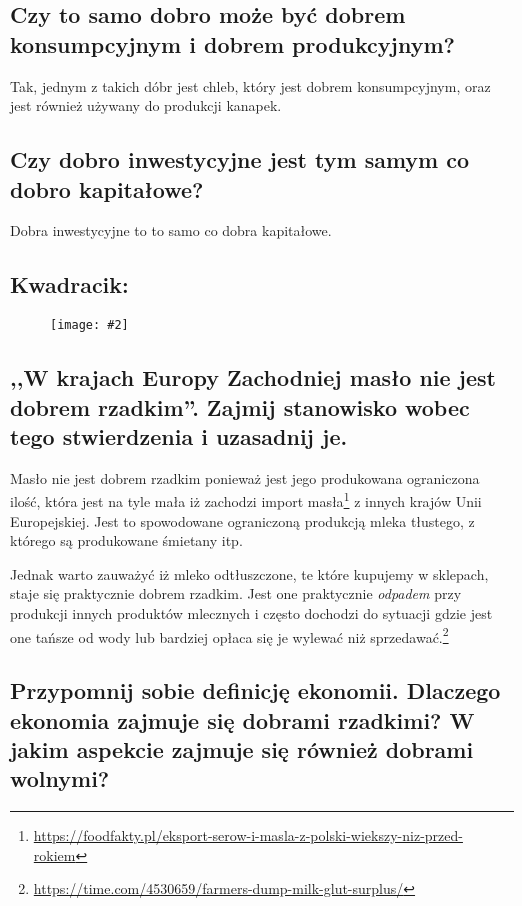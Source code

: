 \documentclass[a4paper,12pt]{article}
\newcommand{\obrazek}[2]{
	\begin{figure}[h]
		\centering
		\texttt{[image: \#2]}
	\end{figure}
}
\begin{document}
\subsection{Czy to samo dobro może być dobrem konsumpcyjnym i dobrem produkcyjnym?}

Tak, jednym z takich dóbr jest chleb, który jest dobrem konsumpcyjnym, oraz jest również używany do produkcji kanapek.

\subsection{Czy dobro inwestycyjne jest tym samym co dobro kapitałowe?}

Dobra inwestycyjne to to samo co dobra kapitałowe.

\subsection{Kwadracik:}

\obrazek{0.5}{kwadrat.png}

\subsection{,,W krajach Europy Zachodniej masło nie jest dobrem rzadkim''. Zajmij stanowisko wobec tego stwierdzenia i uzasadnij je.}

Masło nie jest dobrem rzadkim ponieważ jest jego produkowana ograniczona ilość, która jest na tyle mała iż zachodzi import masła\footnote{\url{https://foodfakty.pl/eksport-serow-i-masla-z-polski-wiekszy-niz-przed-rokiem}} z innych krajów Unii Europejskiej. Jest to spowodowane ograniczoną produkcją mleka tłustego, z którego są produkowane śmietany itp.

Jednak warto zauważyć iż mleko odtłuszczone, te które kupujemy w sklepach, staje się praktycznie dobrem rzadkim. Jest one praktycznie \emph{odpadem} przy produkcji innych produktów mlecznych i często dochodzi do sytuacji gdzie jest one tańsze od wody lub bardziej opłaca się je wylewać niż sprzedawać.\footnote{\url{https://time.com/4530659/farmers-dump-milk-glut-surplus/}}

\subsection{Przypomnij sobie definicję ekonomii. Dlaczego ekonomia zajmuje się dobrami rzadkimi? W jakim aspekcie zajmuje się również dobrami wolnymi?}
\end{document}
